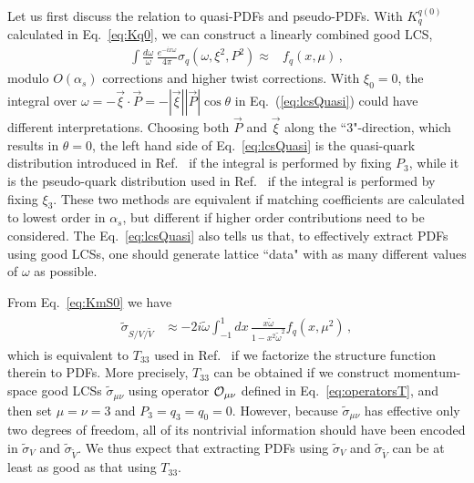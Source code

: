 \documentclass[twocolumn,aps,prl,superscriptaddress,nofootinbib,showpacs]{revtex4-1}
\newcommand{\sect}[1]{\noindent{\it \textbf{#1} ---}}
\begin{document}
\sect{Relation to other methods}
Let us first discuss the relation to quasi-PDFs and pseudo-PDFs. With $K_q^{q(0)}$ calculated in Eq.~\eqref{eq:Kq0}, we can construct a linearly combined good LCS,
\begin{align}\label{eq:lcsQuasi}
\int \frac{d \omega}{\omega}\, \frac{e^{-i x \omega}}{4\pi} \sigma_{q}(\omega,\xi^2,P^2)\approx&f_{q}(x,\mu)\,,
\end{align}
modulo $O(\alpha_s)$ corrections and higher twist corrections. With $\xi_0=0$, the integral over $\omega=-\vec{\xi}\cdot\vec{P}=-|\vec{\xi}||\vec{P}|\cos\theta$ in Eq.~(\ref{eq:lcsQuasi}) could have different interpretations. Choosing both $\vec{P}$ and $\vec{\xi}$ along the ``3"-direction, which results in $\theta=0$, the left hand side of Eq.~\eqref{eq:lcsQuasi} is the quasi-quark distribution introduced in Ref.~\cite{Ji:2013dva} if the integral is performed by fixing $P_3$, while it is the pseudo-quark distribution used in Ref.~\cite{Orginos:2017kos}  if the integral is performed by fixing $\xi_3$. These two methods are equivalent if matching coefficients are calculated to lowest order in $\alpha_s$, but different if higher order contributions need to be considered. The Eq.~\eqref{eq:lcsQuasi} also tells us that, to effectively extract PDFs using good LCSs, one should generate lattice ``data" with as many different values of $\omega$ as possible.


From Eq.~\eqref{eq:KmS0} we have
\begin{align}\label{eq:facMS}
\begin{split}
\widetilde{\sigma}_{S/V/\widetilde{V}}&\approx -2i \widetilde{\omega}\int_{-1}^1 dx\,\frac{ x\widetilde{\omega}}{1-x^2\widetilde{\omega}^{2}} f_{q}(x,\mu^2)\, ,
 \end{split}
\end{align}
which is equivalent to $T_{33}$ used in Ref.~\cite{Chambers:2017dov} if we factorize the structure function therein to PDFs. More precisely, $T_{33}$ can be obtained if we construct momentum-space good LCSs $\widetilde{\sigma}_{\mu\nu}$ using operator ${\cal O}_{\mu\nu}$ defined in Eq.~\eqref{eq:operatorsT}, and then set $\mu=\nu=3$ and $P_3=q_3=q_0=0$. However, because $\widetilde{\sigma}_{\mu\nu}$ has effective only two degrees of freedom, all of its nontrivial information should have been encoded in $\widetilde{\sigma}_{V}$ and $\widetilde{\sigma}_{\widetilde V}$. We thus expect that extracting PDFs using  $\widetilde{\sigma}_{V}$ and $\widetilde{\sigma}_{\widetilde V}$ can be at least as good as that using $T_{33}$.
\end{document}
